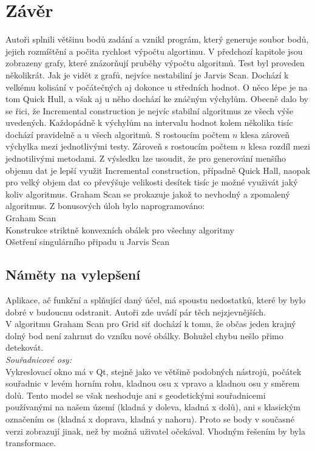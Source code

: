 \documentclass{article}
\begin{document}
\section{Závěr}
\indent Autoři splnili většinu bodů zadání a vznikl prográm, který generuje soubor bodů, jejich rozmíštění a počita rychlost výpočtu algortimu.
V předchozí kapitole jsou zobrazeny grafy, které znázorňují pruběhy výpočtu algoritmů. Test byl proveden několikrát. Jak je vidět z grafů, nejvíce nestabiliní je Jarvis Scan. Dochází k velkému kolisání v počátečných aj dokonce u středních hodnot. O něco lépe je na tom Quick Hull, a však aj u něho dochází ke znáčným výchylům. Obecně dalo by se řici, že Incremental construction je nejvíc stabilní algoritmus ze všech výše uvedených.
\bigskip
Každopádně k výchylům na intervalu hodnot kolem několika tisíc dochází pravidelně a u všech algoritmů. S rostoucím počtem $n$ klesa zároveň výchylka mezi jednotlivými testy. Zároveň s rostoucím počtem $n$ klesa rozdíl mezi jednotilivými metodami. 
\bigskip
Z výsledku lze usoudit, že pro generování menšího objemu dat je lepší využit Incremental construction, případně Quick Hall, naopak pro velký objem dat co převýšuje velikosti desítek tisíc je možné využivát jaký koliv algoritmus.
 Graham Scan se prokazuje jakož to nevhodný a zpomalený algoritmus. 
 Z bonusových úloh bylo naprogramováno:
 \\Graham Scan
\\Konstrukce striktně konvexních obálek pro všechny algoritmy
\\Ošetření singulárního připadu u Jarvis Scan
	\subsection{Náměty na vylepšení} %
	\indent Aplikace, ač funkční a splňující daný účel, má spoustu nedostatků, které by bylo dobré v budoucnu odstranit. Autoři zde uvádí pár těch nejzjevnějších. \\
	\bigskip
	V algoritmu Graham Scan pro Grid siť dochází k tomu, že občas jeden krajný dolný bod není zahrnut do vzníku nové obálky. Bohužel chybu nešlo přimo detekovát.\\
	\bigskip \indent \textit{Souřadnicové osy: }
	\\
	 Vykreslovací okno má v Qt, stejně jako ve většině podobných nástrojů, počátek souřadnic v levém horním rohu, kladnou osu x vpravo a kladnou osu y směrem dolů. Tento model se však neshoduje ani s geodetickými souřadnicemi používanými na našem území (kladná y doleva, kladná x dolů), ani s klasickým označením os (kladná x doprava, kladná y nahoru). Proto se body v současné verzi zobrazují jinak, než by možná uživatel očekával. Vhodným řešením by byla transformace. \\
	\bigskip 


\pagestyle{empty}

\clearpage

\end{document}
